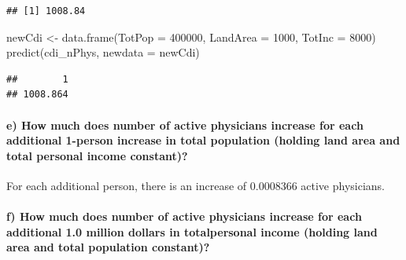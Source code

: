 \documentclass[
]{article}
\newenvironment{Shaded}{\begin{snugshade}}{\end{snugshade}}
\newcommand{\AttributeTok}[1]{\textcolor[rgb]{0.77,0.63,0.00}{#1}}
\newcommand{\DecValTok}[1]{\textcolor[rgb]{0.00,0.00,0.81}{#1}}
\newcommand{\FunctionTok}[1]{\textcolor[rgb]{0.00,0.00,0.00}{#1}}
\newcommand{\NormalTok}[1]{#1}
\newcommand{\OtherTok}[1]{\textcolor[rgb]{0.56,0.35,0.01}{#1}}
\begin{document}
\begin{verbatim}
## [1] 1008.84
\end{verbatim}

\begin{Shaded}
\begin{Highlighting}[]
\NormalTok{newCdi }\OtherTok{\textless{}{-}} \FunctionTok{data.frame}\NormalTok{(}\AttributeTok{TotPop =} \DecValTok{400000}\NormalTok{, }
                     \AttributeTok{LandArea =} \DecValTok{1000}\NormalTok{,}
                     \AttributeTok{TotInc =} \DecValTok{8000}\NormalTok{)}
\FunctionTok{predict}\NormalTok{(cdi\_nPhys, }\AttributeTok{newdata =}\NormalTok{ newCdi)}
\end{Highlighting}
\end{Shaded}

\begin{verbatim}
##        1 
## 1008.864
\end{verbatim}

\hypertarget{e-how-much-does-number-of-active-physicians-increase-for-each-additional-1-person-increase-in-total-population-holding-land-area-and-total-personal-income-constant}{%
\paragraph{e) How much does number of active physicians increase for
each additional 1-person increase in total population (holding land area
and total personal income
constant)?}\label{e-how-much-does-number-of-active-physicians-increase-for-each-additional-1-person-increase-in-total-population-holding-land-area-and-total-personal-income-constant}}

\hfill\break
For each additional person, there is an increase of 0.0008366 active
physicians.

\hypertarget{f-how-much-does-number-of-active-physicians-increase-for-each-additional-1.0-million-dollars-in-totalpersonal-income-holding-land-area-and-total-population-constant}{%
\paragraph{f) How much does number of active physicians increase for
each additional 1.0 million dollars in totalpersonal income (holding
land area and total population
constant)?}\label{f-how-much-does-number-of-active-physicians-increase-for-each-additional-1.0-million-dollars-in-totalpersonal-income-holding-land-area-and-total-population-constant}}
\end{document}
